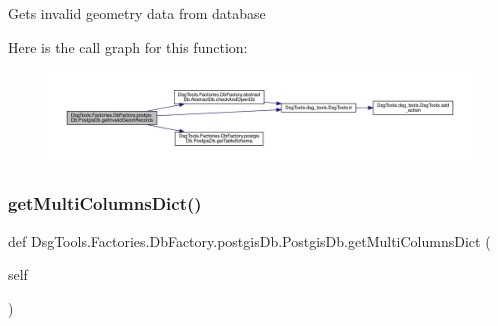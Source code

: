 \begin{DoxyVerb}Gets invalid geometry data from database
\end{DoxyVerb}
 Here is the call graph for this function\+:
\nopagebreak
\begin{figure}[H]
\begin{center}
\leavevmode
\includegraphics[width=350pt]{class_dsg_tools_1_1_factories_1_1_db_factory_1_1postgis_db_1_1_postgis_db_af5a32689ca7097b712de34e08408c323_cgraph}
\end{center}
\end{figure}
\mbox{\label{class_dsg_tools_1_1_factories_1_1_db_factory_1_1postgis_db_1_1_postgis_db_a9830b03a8fe66b790acc2d1c1c2e5f05}} 
\subsubsection{\texorpdfstring{get\+Multi\+Columns\+Dict()}{getMultiColumnsDict()}}
{\footnotesize\ttfamily def Dsg\+Tools.\+Factories.\+Db\+Factory.\+postgis\+Db.\+Postgis\+Db.\+get\+Multi\+Columns\+Dict (\begin{DoxyParamCaption}\item[{}]{self }\end{DoxyParamCaption})}

